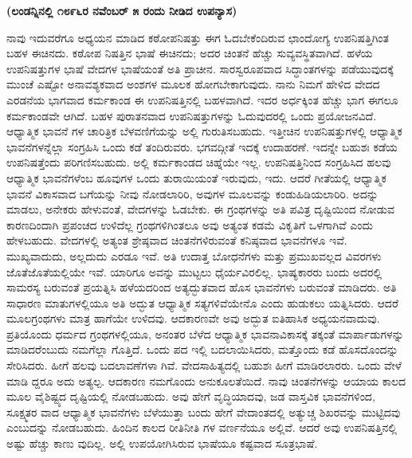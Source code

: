 \centerline{\textbf{(ಲಂಡನ್ನಿನಲ್ಲಿ ೧೮೯೬ರ ನವೆಂಬರ್​ ೫ ರಂದು ನೀಡಿದ ಉಪನ್ಯಾಸ)}}

ನಾವು ಇದುವರೆಗೂ ಅಧ್ಯಯನ ಮಾಡಿದ ಕಠೋಪನಿಷತ್ತು ಈಗ ಓದಬೇಕೆಂದಿರುವ ಛಾಂದೋಗ್ಯ ಉಪನಿಷತ್ತಿಗಿಂತ ಬಹಳ ಈಚಿನದು. ಕಠೋಪ ನಿಷತ್ತಿನ ಭಾಷೆ ಈಚಿನದು; ಅದರ ಚಿಂತನೆ ಹೆಚ್ಚು ಸುವ್ಯವಸ್ಥಿತವಾಗಿದೆ. ಹಳೆಯ ಉಪನಿಷತ್ತುಗಳ ಭಾಷೆ ವೇದಗಳ ಭಾಷೆಯಂತೆ ಅತಿ ಪ್ರಾಚೀನ. ಸಾರಸ್ವರೂಪವಾದ ಸಿದ್ಧಾಂತಗಳನ್ನು ಪಡೆಯುವುದಕ್ಕೆ ಮುಂಚೆ ಎಷ್ಟೋ ಅನಾವಶ್ಯಕವಾದ ಅಂಶಗಳ ಮೂಲಕ ಹೋಗಬೇಕಾಗುವುದು. ನಾನು ನಿಮಗೆ ಹೇಳಿದ ವೇದದ ಎರಡನೆಯ ಭಾಗವಾದ ಕರ್ಮಕಾಂಡ ಈ ಉಪನಿಷತ್ತಿನಲ್ಲಿ ಬಹಳವಾಗಿದೆ. ಇದರ ಅರ್ಧಕ್ಕಿಂತ ಹೆಚ್ಚು ಭಾಗ ಈಗಲೂ ಕರ್ಮಕಾಂಡವೇ ಆಗಿದೆ. ಬಹಳ ಪುರಾತನವಾದ ಉಪನಿಷತ್ತುಗಳನ್ನು ಓದುವುದರಲ್ಲಿ ಒಂದು ಪ್ರಯೋಜನವಿದೆ. ಆಧ್ಯಾತ್ಮಿಕ ಭಾವನೆ ಗಳ ಚಾರಿತ್ರಿಕ ಬೆಳವಣಿಗೆಯನ್ನು ಅಲ್ಲಿ ಗುರುತಿಸಬಹುದು. ಇತ್ತೀಚಿನ ಉಪನಿಷತ್ತುಗಳಲ್ಲಿ ಆಧ್ಯಾತ್ಮಿಕ ಭಾವನೆಗಳನ್ನೆಲ್ಲಾ ಸಂಗ್ರಹಿಸಿ ಒಂದು ಕಡೆ ತಂದಿರುವರು. ಭಗವದ್ಗೀತೆ ಇದಕ್ಕೆ ಉದಾಹರಣೆ. ಇದನ್ನೇ ಬಹುಶಃ ಕಡೆಯ ಉಪನಿಷತ್ತೆಂದು ಪರಿಗಣಿಸಬಹುದು. ಅಲ್ಲಿ ಕರ್ಮಕಾಂಡದ ಚಿಹ್ನೆಯೇ ಇಲ್ಲ. ಉಪನಿಷತ್ತಿನಿಂದ ಸಂಗ್ರಹಿಸಿದ ಹಲವು ಆಧ್ಯಾತ್ಮಿಕ ಭಾವನೆಗಳೆಂಬ ಹೂವುಗಳ ಒಂದು ತುರಾಯಿಯಂತೆ ಇರುವುದು, ಇದು. ಆದರೆ ಗೀತೆಯಲ್ಲಿ ಆಧ್ಯಾತ್ಮಿಕ ಭಾವನೆ ವಿಕಾಸವಾದ ಬಗೆಯನ್ನು ನೀವು ನೋಡಲಾರಿರಿ, ಅವುಗಳ ಮೂಲವನ್ನು ಕಂಡುಹಿಡಿಯಲಾರಿರಿ. ಅದನ್ನು ಮಾಡಲು, ಅನೇಕರು ಹೇಳುವಂತೆ, ವೇದಗಳನ್ನು ಓಡಬೇಕು. ಈ ಗ್ರಂಥಗಳನ್ನು ಅತಿ ಪವಿತ್ರ ದೃಷ್ಟಿಯಿಂದ ನೋಡುವ ಕಾರಣದಿಂದಾಗಿ ಪ್ರಪಂಚದ ಉಳಿದೆಲ್ಲ ಗ್ರಂಥಗಳಿಗಿಂತಲೂ ಅವು ಅತ್ಯಂತ ಕಡಮೆ ವಿಕೃತಿಗೆ ಒಳಗಾಗಿವೆ ಎಂದು ಹೇಳಬಹುದು. ವೇದಗಳಲ್ಲಿ ಅತ್ಯಂತ ಶ್ರೇಷ್ಠವಾದ ಚಿಂತನೆಗಳಿರುವಂತೆ ಕನಿಷ್ಠವಾದ ಭಾವನೆಗಳೂ ಇವೆ. ಮುಖ್ಯವಾದುದು, ಅಲ್ಲದುದು ಎರಡೂ ಇವೆ. ಅತಿ ಉದಾತ್ತ ಬೋಧನೆಗಳು ಮತ್ತು ಪ್ರಮುಖವಲ್ಲದ ವಿವರಗಳು ಜೊತೆಜೊತೆಯಲ್ಲಿಯೇ ಇವೆ. ಯಾರಿಗೂ ಅವನ್ನು ಮುಟ್ಟಲು ಧೈರ್ಯವಿರಲಿಲ್ಲ. ಭಾಷ್ಯಕಾರರು ಬಂದು ಅದರಲ್ಲಿ ಸಾಮರಸ್ಯ ಬರುವಂತೆ ಪ್ರಯತ್ನಿಸಿ ಹಳೆಯದರಿಂದ ಅತ್ಯದ್ಭುತವಾದ ಹೊಸ ಭಾವನೆಗಳು ಬರುವಂತೆ ಮಾಡಿದರು. ಅತಿ ಸಾಧಾರಣ ಮಾತುಗಳಲ್ಲಿಯೂ ಅತಿ ಅದ್ಭುತ ಆಧ್ಯಾತ್ಮಿಕ ಸತ್ಯಗಳಿವೆಯೇನೊ ಎಂದು ಹುಡುಕಲು ಯತ್ನಿಸಿದರು. ಆದರೆ ಮೂಲಗ್ರಂಥಗಳು ಮಾತ್ರ ಹಾಗೆಯೇ ಉಳಿದವು. ಆದಕಾರಣವೇ ಅವು ಅದ್ಭುತ ಐತಿಹಾಸಿಕ ಅಧ್ಯಯನವಾದುವು. ಪ್ರತಿಯೊಂದು ಧರ್ಮದ ಗ್ರಂಥಗಳಲ್ಲಿಯೂ, ಅನಂತರ ಬೆಳೆದ ಆಧ್ಯಾತ್ಮಿಕ ಭಾವನಾವಿಕಾಸಕ್ಕೆ ತಕ್ಕಂತೆ ಮಾರ್ಪಾಡುಗಳನ್ನು ಮಾಡಿದರೆಂಬುದು ನಮಗೆಲ್ಲಾ ಗೊತ್ತಿದೆ. ಒಂದು ಪದ ಇಲ್ಲಿ ಬದಲಾಯಿಸಿದರು, ಮತ್ತೊಂದು ಕಡೆ ಹೊಸದೊಂದನ್ನು ಸೇರಿಸಿದರು. ಹೀಗೆ ಹಲವು ಬದಲಾವಣೆಗಳಾ ಗಿವೆ. ವೇದಸಾಹಿತ್ಯದಲ್ಲಿ ಬಹುಶಃ ಹೀಗೆ ಮಾಡಿರಲಾರರು. ಒಂದು ವೇಳೆ ಮಾಡಿ ದ್ದರೂ ಅದು ಅತ್ಯಲ್ಪ. ಆದಕಾರಣ ನಮಗೊಂದು ಅನುಕೂಲತೆಯಿದೆ. ನಾವು ಚಿಂತನೆಗಳನ್ನು ಆಯಾಯ ಕಾಲದ ಮೂಲ ವೈಶಿಷ್ಟ್ಯದ ದೃಷ್ಟಿಯಲ್ಲಿ ನೋಡಬಹುದು. ಅವು ಹೇಗೆ ವೃದ್ಧಿಯಾದವು, ಜಡ ವಾಸ್ತವಿಕ ಭಾವನೆಗಳಿಂದ, ಸೂಕ್ಷ್ಮತರ ವಾದ ಆಧ್ಯಾತ್ಮಿಕ ಭಾವನೆಗಳು ಬೆಳೆಯುತ್ತಾ ಬಂದು ಹೇಗೆ ವೇದಾಂತದಲ್ಲಿ ಅತ್ಯುಚ್ಚ ಶಿಖರವನ್ನು ಮುಟ್ಟಿದವು ಎಂಬುದನ್ನು ನೋಡಬಹುದು. ಹಿಂದಿನ ಕಾಲದ ರೀತಿನೀತಿ ಗಳ ವರ್ಣನೆಯೂ ಅಲ್ಲಿವೆ. ಆದರೆ ಅವು ಉಪನಿಷತ್ತಿನಲ್ಲಿ ಅಷ್ಟು ಹೆಚ್ಚು ಕಾಣು ವುದಿಲ್ಲ. ಅಲ್ಲಿ ಉಪಯೋಗಿಸಿರುವ ಭಾಷೆಯೂ ಕಷ್ಟವಾದ ಸೂತ್ರಭಾಷೆ.

